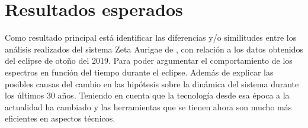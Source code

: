 \documentclass[11pt]{article}
\begin{document}

\section{Resultados esperados}

Como resultado principal está identificar las diferencias y/o similitudes entre los análisis realizados del sistema Zeta Aurigae de \cite{kps1O}, \cite{complete} con relación a los datos obtenidos del eclipse de otoño del 2019. Para poder argumentar el comportamiento de los espectros en función del tiempo durante el eclipse. Además de explicar las posibles causas del cambio en las hipótesis sobre la dinámica del sistema durante los últimos 30 años. Teniendo en cuenta que la tecnología desde esa época a la actualidad ha cambiado y las herramientas que se tienen ahora son mucho más eficientes en aspectos técnicos.

\end{document}
